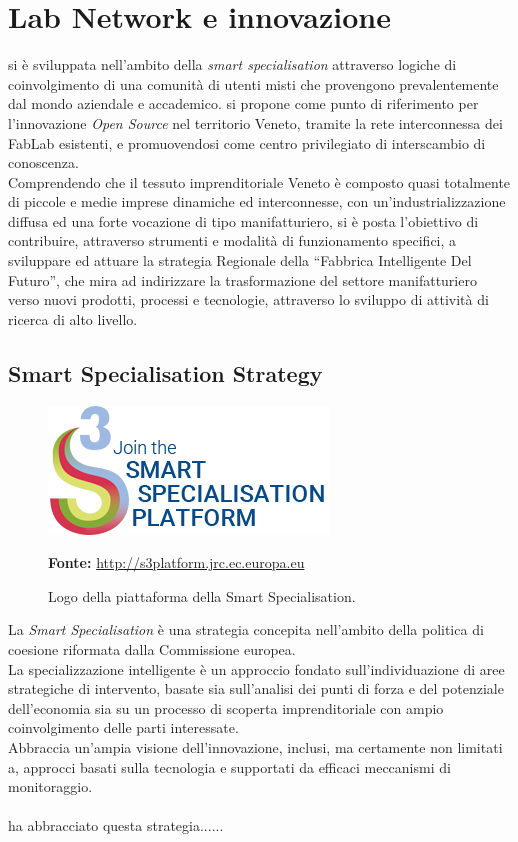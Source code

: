 \section{Lab Network e innovazione}
\lab{} si è sviluppata nell’ambito della \textit{smart specialisation} attraverso logiche di coinvolgimento di una comunità di utenti misti che provengono prevalentemente dal mondo aziendale e accademico. 
\lab{} si propone come punto di riferimento per l’innovazione \textit{Open Source} nel territorio Veneto, tramite la rete interconnessa dei \gls{FabLab} esistenti, e promuovendosi come centro privilegiato di interscambio di conoscenza.\\
Comprendendo che il tessuto imprenditoriale Veneto è composto quasi totalmente di piccole e medie imprese dinamiche ed interconnesse, con un’industrializzazione diffusa ed una forte vocazione di tipo manifatturiero, \lab{} si è posta l’obiettivo di contribuire, attraverso strumenti e modalità di funzionamento specifici, a sviluppare ed attuare la strategia Regionale della ``Fabbrica Intelligente Del Futuro'', che mira ad indirizzare la trasformazione del settore manifatturiero verso nuovi prodotti, processi e tecnologie, attraverso lo sviluppo di attività di ricerca di alto livello.

\subsection{Smart Specialisation Strategy}
\begin{figure}[H]
	\begin{center}
	\includegraphics[scale=0.4]{immagini/join-s3p.png}
	\caption{Logo della piattaforma della Smart Specialisation.}
	\small{\textbf{Fonte:} \url{http://s3platform.jrc.ec.europa.eu}}
	\end{center}
\end{figure}

La \textit{Smart Specialisation} è una strategia concepita nell'ambito della politica di coesione riformata dalla Commissione europea.\\
La specializzazione intelligente è un approccio fondato sull'individuazione di aree strategiche di intervento, basate sia sull'analisi dei punti di forza e del potenziale dell'economia sia su un processo di scoperta imprenditoriale con ampio coinvolgimento delle parti interessate.\\
Abbraccia un'ampia visione dell'innovazione, inclusi, ma certamente non limitati a, approcci basati sulla tecnologia e supportati da efficaci meccanismi di monitoraggio.\\
\\
\lab{} ha abbracciato questa strategia......
